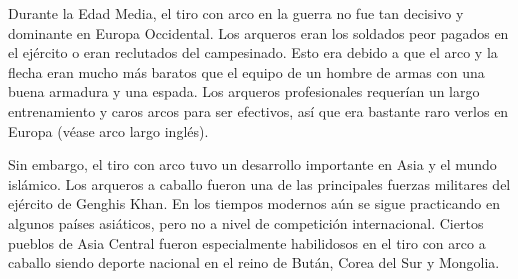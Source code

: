 \documentclass[12pt, legalpaper, twocolumn]{article}
\begin{document}
Durante la Edad Media, el tiro con arco en la guerra no fue tan decisivo y dominante en Europa Occidental. Los arqueros eran los soldados peor pagados en el ejército o eran reclutados del campesinado. Esto era debido a que el arco y la flecha eran mucho más baratos que el equipo de un hombre de armas con una buena armadura y una espada. Los arqueros profesionales requerían un largo entrenamiento y caros arcos para ser efectivos, así que era bastante raro verlos en Europa (véase arco largo inglés).

Sin embargo, el tiro con arco tuvo un desarrollo importante en Asia y el mundo islámico. Los arqueros a caballo fueron una de las principales fuerzas militares del ejército de Genghis Khan. En los tiempos modernos aún se sigue practicando en algunos países asiáticos, pero no a nivel de competición internacional. Ciertos pueblos de Asia Central fueron especialmente habilidosos en el tiro con arco a caballo siendo deporte nacional en el reino de Bután, Corea del Sur y Mongolia.


\end{document}
